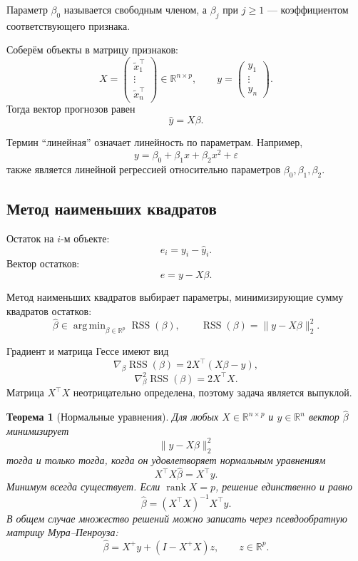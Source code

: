 \documentclass[12pt,a4paper]{article}
\newtheorem{theorem}{Теорема}[section]
\theoremstyle{definition}
\theoremstyle{remark}
\newcommand{\R}{\mathbb{R}}
\newcommand{\rank}{\operatorname{rank}}
\DeclareMathOperator*{\argmin}{arg\,min}
\begin{document}
Параметр $\beta_0$ называется свободным членом, а $\beta_j$ при $j\geq 1$ ---
коэффициентом соответствующего признака.

Соберём объекты в матрицу признаков:
\[
    X=
    \begin{pmatrix}
        \widetilde x_1^\top\\
        \vdots\\
        \widetilde x_n^\top
    \end{pmatrix}
    \in\R^{n\times p},
    \qquad
    y=
    \begin{pmatrix}
        y_1\\ \vdots\\y_n
    \end{pmatrix}.
\]
Тогда вектор прогнозов равен
\[
    \widehat y=X\beta.
\]

Термин ``линейная'' означает линейность по параметрам. Например,
\[
    y
    =
    \beta_0+\beta_1x+\beta_2x^2+\varepsilon
\]
также является линейной регрессией относительно параметров
$\beta_0,\beta_1,\beta_2$.

\subsection{Метод наименьших квадратов}

Остаток на $i$-м объекте:
\[
    e_i=y_i-\widehat y_i.
\]
Вектор остатков:
\[
    e=y-X\beta.
\]

Метод наименьших квадратов выбирает параметры, минимизирующие сумму
квадратов остатков:
\[
    \widehat\beta
    \in
    \argmin_{\beta\in\R^p}
    \operatorname{RSS}(\beta),
    \qquad
    \operatorname{RSS}(\beta)
    =
    \|y-X\beta\|_2^2.
\]

Градиент и матрица Гессе имеют вид
\[
    \nabla_\beta\operatorname{RSS}(\beta)
    =
    2X^\top(X\beta-y),
\]
\[
    \nabla_\beta^2\operatorname{RSS}(\beta)
    =
    2X^\top X.
\]
Матрица $X^\top X$ неотрицательно определена, поэтому задача является
выпуклой.

\begin{theorem}[Нормальные уравнения]
Для любых $X\in\R^{n\times p}$ и $y\in\R^n$ вектор
$\widehat\beta$ минимизирует
\[
    \|y-X\beta\|_2^2
\]
тогда и только тогда, когда он удовлетворяет нормальным уравнениям
\[
    X^\top X\widehat\beta=X^\top y.
\]
Минимум всегда существует. Если $\rank X=p$, решение единственно и равно
\[
    \boxed{
    \widehat\beta=(X^\top X)^{-1}X^\top y
    }.
\]
В общем случае множество решений можно записать через псевдообратную
матрицу Мура--Пенроуза:
\[
    \widehat\beta
    =
    X^+y+(I-X^+X)z,
    \qquad z\in\R^p.
\]
\end{theorem}
\end{document}
